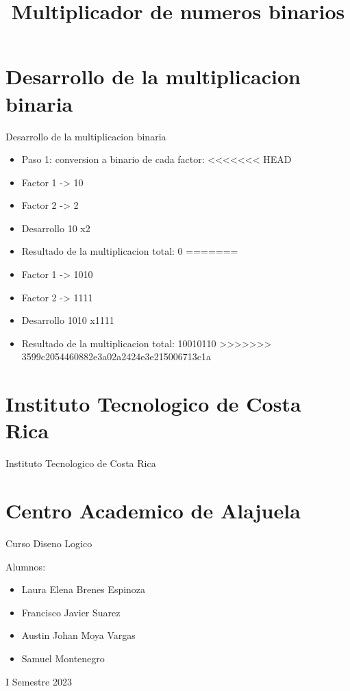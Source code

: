 \documentclass[11pt]{beamer}
\title{Multiplicador de numeros binarios}
\begin{document}
    \begin{frame}
        \maketitle
    \end{frame}
    \section{Desarrollo de la multiplicacion binaria}
    \begin{frame}{Desarrollo de la multiplicacion binaria}
        \begin{itemize}
        \item Paso 1: conversion a binario de cada factor:
<<<<<<< HEAD
        \item    Factor 1 -> 10
        \item    Factor 2 -> 2
        \item Desarrollo 
        \newline
      \hphantom{123456789101112}10
        \newline      \hphantom{12345678910111}x2
        \item Resultado de la multiplicacion total: 0
=======
        \item    Factor 1 -> 1010
        \item    Factor 2 -> 1111
        \item Desarrollo 
        \newline
      \hphantom{123456789101112}1010
        \newline      \hphantom{12345678910111}x1111
        \item Resultado de la multiplicacion total: 10010110
>>>>>>> 3599c2054460882e3a02a2424e3e215006713c1a
        \end{itemize}
    \end{frame}
    \section{Instituto Tecnologico de Costa Rica}
    \begin{frame}{Instituto Tecnologico de Costa Rica}    \section{Centro Academico de Alajuela}        Curso Diseno Logico 
        \newline

        Alumnos:
        \begin{itemize}
        \item Laura Elena Brenes Espinoza
        \item Francisco Javier Suarez 
        \item Austin Johan Moya Vargas
        \item Samuel Montenegro
        \end{itemize}

        I Semestre 2023
    \end{frame}
    
\end{document}
